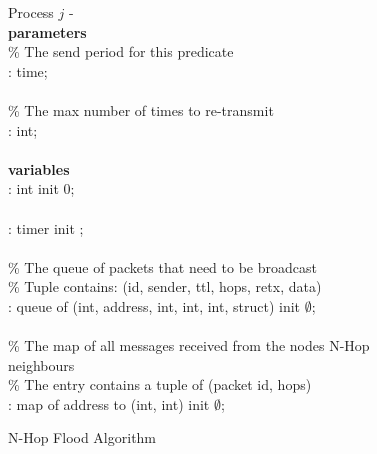\begin{figure}[H]
  \centering
  \begin{boxedminipage}{\linewidth}
    \null Process $j$ - \\
    \null \textbf{parameters}\\
    \null\qq \% The send period for this predicate\\
    \null\qq {}: time;\\~\\
    \null\qq \% The max number of times to re-transmit\\
    \null\qq {}: int;\\~\\
    \null \textbf{variables}\\
    \null\qq {}: int init 0;\\~\\
    \null\qq {}: timer init ;\\~\\
    \null\qq \% The queue of packets that need to be broadcast\\
    \null\qq \% Tuple contains: (id, sender, ttl, hops, retx, data)\\
    \null\qq {}: queue of (int, address, int, int, int, struct) init $\emptyset$;\\~\\
    \null\qq \% The map of all messages received from the nodes N-Hop neighbours\\
    \null\qq \% The entry contains a tuple of (packet id, hops)\\
    \null\qq {}: map of address to (int, int) init $\emptyset$;\\
  \end{boxedminipage}
  \caption{N-Hop Flood Algorithm}
  \label{fig:n-hop-flood-algorithm}
\end{figure}
